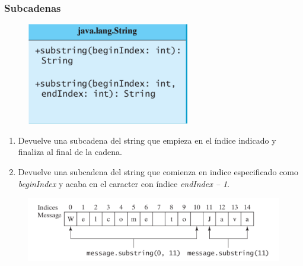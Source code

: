\documentclass{beamer}
\begin{document}
\begin{frame}
\frametitle{Subcadenas}
\begin{figure}
\includegraphics[scale=0.7]{imagenes/substring1.png}
\end{figure}
\pause
\begin{enumerate}[<+->]
\item Devuelve una subcadena del string que empieza en el índice indicado y finaliza al final de la cadena.
\item Devuelve una subcadena del string que comienza en indice especificado como \emph{beginIndex} y acaba en el caracter con índice \emph{endIndex – 1}.
\end{enumerate}
\pause
\begin{figure}
\includegraphics[scale=0.5]{imagenes/substring2.png}
\end{figure}
\end{frame}
\end{document}
